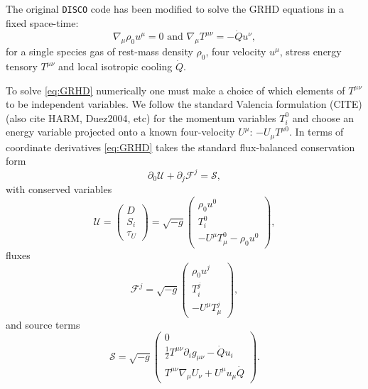 \documentclass{emulateapj}
\newcommand{\pd}{\partial}
\newcommand{\DISCO}{{\texttt{DISCO}}}
\begin{document}
The original \DISCO{} code has been modified to solve the GRHD equations in a 
fixed space-time:
\begin{equation}
    \nabla_\mu \rho_0 u^\mu = 0 \text{ and } \nabla_\mu T^{\mu\nu} = -\dot{Q} u^\nu , \label{eq:GRHD}
\end{equation}
for a single species gas of rest-mass density $\rho_0$, four velocity $u^\mu$, 
stress energy tensory $T^{\mu\nu}$ and local isotropic cooling $\dot{Q}$.  

To solve \eqref{eq:GRHD} numerically one must make a choice of which elements of $T^{\mu\nu}$ to be independent variables.  We follow the standard Valencia formulation (CITE) (also cite HARM, Duez2004, etc) for the momentum variables $T^0_i$ and choose an energy variable projected onto a known four-velocity $U^\mu$: $-U_\mu T^{\mu 0}$.
In terms of coordinate derivatives \eqref{eq:GRHD} takes the standard flux-balanced conservation form
\begin{equation}
    \pd_0 \mathcal{U} + \pd_j \mathcal{F}^j = \mathcal{S} , \label{eq:consLaw}
\end{equation}
with conserved variables
\begin{equation}
    \mathcal{U} = \begin{pmatrix} D \\
                            S_i \\
                            \tau_U
                \end{pmatrix} = \sqrt{-g} \begin{pmatrix} \rho_0 u^0 \\ 
                                                    T^0_i \\
                                                    -U^\mu T_\mu^0 - \rho_0 u^0 \end{pmatrix} , \label{eq:cons}
\end{equation}
fluxes
\begin{equation}
    \mathcal{F}^j = \sqrt{-g} \begin{pmatrix} \rho_0 u^j \\
                                                T^j_i \\
                                                -U^\mu T_\mu^j \end{pmatrix} ,\label{eq:fluxes}
\end{equation}
and source terms 
\begin{equation}
    \mathcal{S} = \sqrt{-g} \begin{pmatrix} 0 \\
                        \frac{1}{2}T^{\mu\nu}\pd_i g_{\mu\nu} - \dot{Q}u_i \\
                        T^{\mu\nu}\nabla_\mu U_\nu + U^\mu u_\mu \dot{Q} \end{pmatrix} .\label{eq:sources}
\end{equation}
\end{document}
